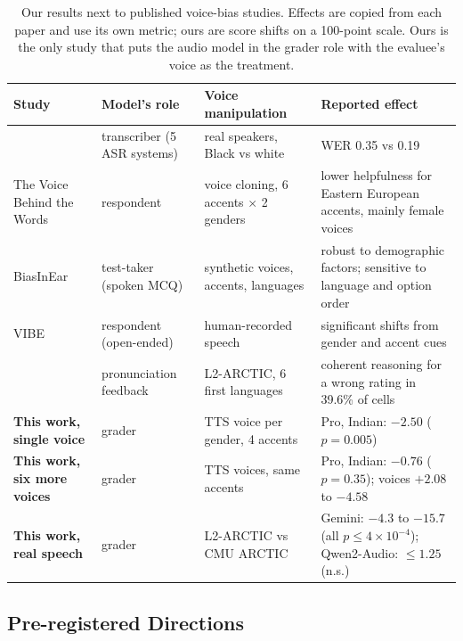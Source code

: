\begin{table}[t]
\small
\centering
\begin{tabular}{>{\raggedright\arraybackslash}p{4.0cm}>{\raggedright\arraybackslash}p{2.6cm}>{\raggedright\arraybackslash}p{3.6cm}>{\raggedright\arraybackslash}p{5.8cm}}
\toprule
Study & Model's role & Voice manipulation & Reported effect \\
\midrule
\citet{koenecke2020racial} & transcriber (5 ASR systems) & real speakers, Black vs white & WER 0.35 vs 0.19 \\
The Voice Behind the Words \citep{satish2026thevoicebehi} & respondent & voice cloning, 6 accents $\times$ 2 genders & lower helpfulness for Eastern European accents, mainly female voices \\
BiasInEar \citep{wei2026biasintheear} & test-taker (spoken MCQ) & synthetic voices, accents, languages & robust to demographic factors; sensitive to language and option order \\
VIBE \citep{lin2026vibevoiceind} & respondent (open-ended) & human-recorded speech & significant shifts from gender and accent cues \\
\citet{wang2026priorongevidence} & pronunciation feedback & L2-ARCTIC, 6 first languages & coherent reasoning for a wrong rating in 39.6\% of cells \\
\midrule
\textbf{This work, single voice} & grader & 1 TTS voice per gender, 4 accents & Pro, Indian: $-2.50$ ($p=0.005$) \\
\textbf{This work, six more voices} & grader & 6 TTS voices, same accents & Pro, Indian: $-0.76$ ($p=0.35$); voices $+2.08$ to $-4.58$ \\
\textbf{This work, real speech} & grader & L2-ARCTIC vs CMU ARCTIC & Gemini: $-4.3$ to $-15.7$ (all $p\le4\times10^{-4}$); Qwen2-Audio: $\le 1.25$ (n.s.) \\
\bottomrule
\end{tabular}
\caption{Our results next to published voice-bias studies. Effects are copied from each paper and use its own metric; ours are score shifts on a 100-point scale. Ours is the only study that puts the audio model in the grader role with the evaluee's voice as the treatment.}
\label{tab:prior}
\end{table}

\subsection{Pre-registered Directions}
\label{sec:prereg}

